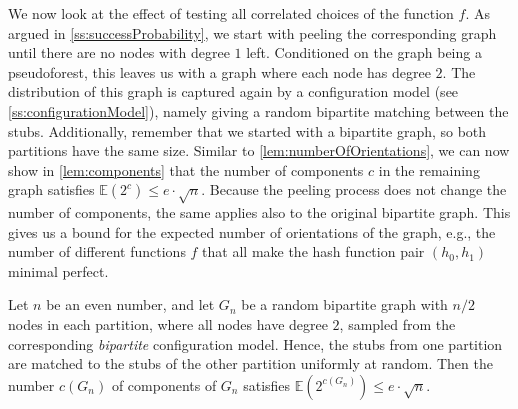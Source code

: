 \documentclass[a4paper,USenglish,cleveref]{lipics-v2021}
\begin{document}
We now look at the effect of testing all correlated choices of the function $f$.
As argued in \cref{ss:successProbability}, we start with peeling the corresponding graph until there are no nodes with degree $1$ left.
Conditioned on the graph being a pseudoforest, this leaves us with a graph where each node has degree $2$.
The distribution of this graph is captured again by a configuration model (see \cref{ss:configurationModel}), namely giving a random bipartite matching between the stubs.
Additionally, remember that we started with a bipartite graph, so both partitions have the same size.
Similar to \cref{lem:numberOfOrientations}, we can now show in \cref{lem:components} that the number of components $c$ in the remaining graph satisfies $\mathds{E}(2^{c}) \leq e\cdot\sqrt{n}$.
Because the peeling process does not change the number of components, the same applies also to the original bipartite graph.
This gives us a bound for the expected number of orientations of the graph, e.g., the number of different functions $f$ that all make the hash function pair $(h_0,h_1)$ minimal perfect.
\begin{lemma}
  Let $n$ be an even number, and let $G_n$ be a random bipartite graph with $n/2$ nodes in each partition, where all nodes have degree $2$, sampled from the corresponding \emph{bipartite} configuration model.
  Hence, the stubs from one partition are matched to the stubs of the other partition uniformly at random.
  Then the number $c(G_n)$ of components of $G_n$ satisfies $\mathds{E}(2^{c(G_n)}) \leq e\cdot\sqrt{n}$.
  \label{lem:components}
\end{lemma}
\end{document}
